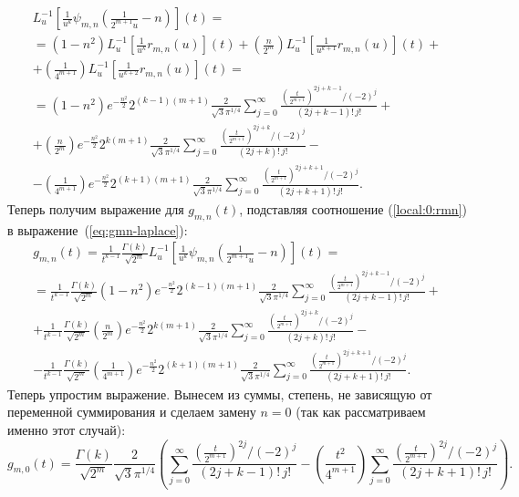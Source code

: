 \documentclass[../paper.tex]{subfiles}
\begin{document}
\begin{multline}\label{local:0:rmn}
    L^{-1}_u \left[ \frac{1}{u^k} \psi_{m,n} \left( \frac{1}{2^{m+1} u} - n \right) \right] (t)
=\\=
    \left( 1 - n^2 \right)  L^{-1}_u \left[ \frac{1}{u^k} r_{m,n}(u) \right](t) +
    \left( \frac{n}{2^m} \right)  L^{-1}_u \left[ \frac{1}{u^{k+1}} r_{m,n}(u) \right](t)
+\\+
    \left( \frac{1}{4^{m+1}} \right)  L^{-1}_u \left[ \frac{1}{u^{k+2}} r_{m,n}(u) \right](t)
=\\=
    \left( 1-n^2 \right) 
    e^{-\frac{n^2}{2}} 2^{(k-1)(m+1)} \frac{2}{\sqrt{3} \pi^{1/4}}
    \sum_{j=0}^{\infty} \frac{\left(\frac{t}{2^{m+1}}\right)^{2j+k-1} / (-2)^j}{(2j+k-1)!\,j!}
+\\+
    \left( \frac{n}{2^m} \right) 
    e^{-\frac{n^2}{2}} 2^{k(m+1)} \frac{2}{\sqrt{3} \pi^{1/4}}
    \sum_{j=0}^{\infty} \frac{\left(\frac{t}{2^{m+1}}\right)^{2j+k} / (-2)^j}{(2j+k)!\,j!}
-\\-
    \left( \frac{1}{4^{m+1}} \right) 
    e^{-\frac{n^2}{2}} 2^{(k+1)(m+1)} \frac{2}{\sqrt{3} \pi^{1/4}}
    \sum_{j=0}^{\infty} \frac{\left(\frac{t}{2^{m+1}}\right)^{2j+k+1} / (-2)^j}{(2j+k+1)!\,j!}
.\end{multline}
Теперь получим выражение для $g_{m,n}(t)$, подставляя соотношение (\ref{local:0:rmn}) в выражение~(\ref{eq:gmn-laplace}):
\begin{multline*}
    g_{m,n}(t) = 
    \frac{1}{t^{k-1}} \frac{\Gamma(k)}{\sqrt{2^m}} L^{-1}_u \left[ \frac{1}{u^k} \psi_{m,n} \left( \frac{1}{2^{m+1} u} - n \right) \right] (t)
=\\=
    \frac{1}{t^{k-1}} \frac{\Gamma(k)}{\sqrt{2^m}} \left( 1-n^2 \right) 
    e^{-\frac{n^2}{2}} 2^{(k-1)(m+1)} \frac{2}{\sqrt{3} \pi^{1/4}}
    \sum_{j=0}^{\infty} \frac{\left(\frac{t}{2^{m+1}}\right)^{2j+k-1} / (-2)^j}{(2j+k-1)!\,j!}
+\\+
    \frac{1}{t^{k-1}} \frac{\Gamma(k)}{\sqrt{2^m}} \left( \frac{n}{2^m} \right) 
    e^{-\frac{n^2}{2}} 2^{k(m+1)} \frac{2}{\sqrt{3} \pi^{1/4}}
    \sum_{j=0}^{\infty} \frac{\left(\frac{t}{2^{m+1}}\right)^{2j+k} / (-2)^j}{(2j+k)!\,j!}
-\\-
    \frac{1}{t^{k-1}} \frac{\Gamma(k)}{\sqrt{2^m}} \left( \frac{1}{4^{m+1}} \right) 
    e^{-\frac{n^2}{2}} 2^{(k+1)(m+1)} \frac{2}{\sqrt{3} \pi^{1/4}}
    \sum_{j=0}^{\infty} \frac{\left(\frac{t}{2^{m+1}}\right)^{2j+k+1} / (-2)^j}{(2j+k+1)!\,j!}
.\end{multline*}
%
Теперь упростим выражение. Вынесем из суммы, степень, не зависящую от переменной суммирования и сделаем замену $n=0$ (так как рассматриваем именно этот случай):
\[
    g_{m,0}(t) =
%
    \frac{\Gamma(k)}{\sqrt{2^m}}
    \frac{2}{\sqrt{3} \pi^{1/4}} \left(
%
    \sum_{j=0}^{\infty} \frac{\left(\frac{t}{2^{m+1}}\right)^{2j} / (-2)^j}{(2j+k-1)!\,j!}
-
    \left( \frac{t^2}{4^{m+1}} \right) 
    \sum_{j=0}^{\infty} \frac{\left(\frac{t}{2^{m+1}}\right)^{2j} / (-2)^j}{(2j+k+1)!\,j!}
%
    \right)
.\]
\end{document}
